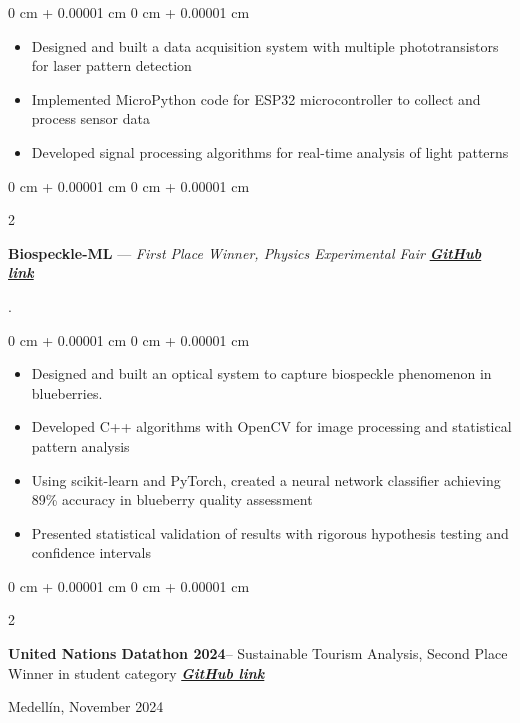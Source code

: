 \documentclass[10pt, letterpaper]{article}
\newenvironment{highlights}{
    \begin{itemize}[
        topsep=0.10 cm,
        parsep=0.10 cm,
        partopsep=0pt,
        itemsep=0pt,
        leftmargin=0 cm + 10pt
    ]
}{
    \end{itemize}
}
\newenvironment{onecolentry}{
    \begin{adjustwidth}{
        0 cm + 0.00001 cm
    }{
        0 cm + 0.00001 cm
    }
}{
    \end{adjustwidth}
}
\newenvironment{twocolentry}[2][]{
    \onecolentry
    \def\secondColumn{#2}
    \setcolumnwidth{\fill, 4.5 cm}
    \begin{paracol}{2}
}{
    \switchcolumn \raggedleft \secondColumn
    \end{paracol}
    \endonecolentry
}
\begin{document}
    \vspace{0.10 cm}
    \begin{onecolentry}
        \begin{highlights}
            \item Designed and built a data acquisition system with multiple phototransistors for laser pattern detection
            \item Implemented MicroPython code for ESP32 microcontroller to collect and process sensor data
            \item Developed signal processing algorithms for real-time analysis of light patterns
        \end{highlights}
    \end{onecolentry}

    \begin{twocolentry}{
        2024.
    }
        \textbf{Biospeckle-ML} --- \textit{First Place Winner, Physics Experimental Fair} \textbf{\textit{\href{https://github.com/JuanJ27/Biospeckle-ML}{GitHub link}}}
    \end{twocolentry}

    \vspace{0.10 cm}
    \begin{onecolentry}
        \begin{highlights}
            \item Designed and built an optical system to capture biospeckle phenomenon in blueberries.
            \item Developed C++ algorithms with OpenCV for image processing and statistical pattern analysis
            \item Using scikit-learn and PyTorch, created a neural network classifier achieving 89\% accuracy in blueberry quality assessment
            \item Presented statistical validation of results with rigorous hypothesis testing and confidence intervals
        \end{highlights}
    \end{onecolentry}


    \begin{twocolentry}{
        Medellín, November 2024
    }
        \textbf{United Nations Datathon 2024}-- Sustainable Tourism Analysis, Second Place Winner in student category 
        \textbf{\textit{\href{https://github.com/JuanJ27/UN-Datathon-sisifos}{GitHub link}}}
    \end{twocolentry}
\end{document}
